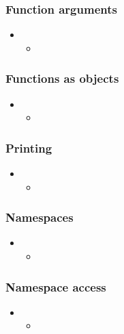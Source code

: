 \begin{frame}[fragile]
%
  \frametitle{Function arguments}
%
  \begin{itemize}
%
  \item 
    \begin{itemize}
    \item
    \end{itemize}
%
  \end{itemize}
%
\end{frame}

\begin{frame}[fragile]
%
  \frametitle{Functions as objects}
%
  \begin{itemize}
%
  \item 
    \begin{itemize}
    \item
    \end{itemize}
%
  \end{itemize}
%
\end{frame}

\begin{frame}[fragile]
%
  \frametitle{Printing}
%
  \begin{itemize}
%
  \item 
    \begin{itemize}
    \item
    \end{itemize}
%
  \end{itemize}
%
\end{frame}

\begin{frame}[fragile]
%
  \frametitle{Namespaces}
%
  \begin{itemize}
%
  \item 
    \begin{itemize}
    \item
    \end{itemize}
%
  \end{itemize}
%
\end{frame}

\begin{frame}[fragile]
%
  \frametitle{Namespace access}
%
  \begin{itemize}
%
  \item 
    \begin{itemize}
    \item
    \end{itemize}
%
  \end{itemize}
%
\end{frame}

